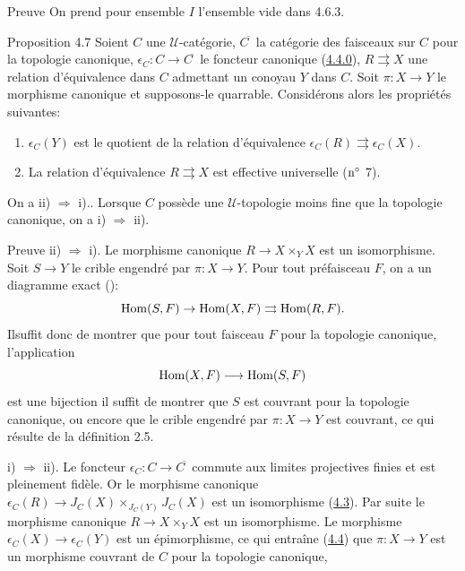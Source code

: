 \documentclass[10pt]{../fichiers-configuration-latex/smfart}
\begin{document}
\begin{enonce*}[remark]{Preuve}
On prend pour ensemble $I$ l'ensemble vide dans 4.6.3.
\end{enonce*}

\begin{enonce*}{Proposition 4.7}
Soient $C$ une $𝒰$-catégorie,
$C^{\widetilde{\phantom{,}}}$ la catégorie des faisceaux sur $C$
pour la topologie canonique, $\epsilon_C:C\rightarrow
C^{\widetilde{\phantom{,}}}$ le foncteur canonique
(\hyperref[II.subsubsec4.4.0]{4.4.0}), $R\rightrightarrows X$ une relation
d'équivalence dans $C$ admettant un conoyau $Y$ dans $C$. Soit
$\pi:X\rightarrow Y$ le morphisme canonique et supposons-le
quarrable. Considérons alors les propriétés suivantes:
\begin{enumerate}
\renewcommand{\theenumi}{\roman{enumi}}
\renewcommand{\labelenumi}{\theenumi)}
\item $\epsilon_C(Y)$ est le quotient de la relation d'équivalence
  $\epsilon_C(R)\rightrightarrows \epsilon_C(X)$.

\item La relation d'équivalence $R\rightrightarrows X$ est effective
  universelle {\rm(\cf ${\rm n^{\circ}}$ 7).}
\end{enumerate}
On a {\rm{ii) $\Rightarrow$ i).}}. Lorsque $C$ possède une
$𝒰$-topologie moins fine que la topologie canonique, on a
{\rm{i) $\Rightarrow$ ii).}}
\end{enonce*}

\begin{enonce*}[remark]{Preuve}
ii) $\Rightarrow$ i). Le morphisme canonique $R\rightarrow X\times_Y
X$ est un isomorphisme. Soit $S\rightarrow Y$ le crible engendré
par $\pi:X\rightarrow Y$. Pour tout préfaisceau $F$, on a un
diagramme exact ():
$$
\operatorname{Hom}(S,F)\rightarrow \operatorname{Hom}(X,F)\rightrightarrows \operatorname{Hom}(R,F){}.
$$
Il\pageoriginale suffit donc de montrer que pour tout faisceau $F$
pour la topologie canonique, l'application
$$
\operatorname{Hom}(X,F)\longrightarrow \operatorname{Hom}(S,F)
$$
est une bijection \ie il suffit de montrer que $S$ est couvrant pour
la topologie canonique, ou encore que le crible engendré par
$\pi:X\rightarrow Y$ est couvrant, ce qui résulte de la
définition 2.5.

\noindent i) $\Rightarrow$ ii). Le foncteur $\epsilon_C:C\rightarrow
C^{\widetilde{\phantom{,}}}$ commute aux limites projectives finies
et est pleinement fidèle. Or le morphisme canonique
$\epsilon_C(R)\rightarrow J_C(X)\times_{J_C(Y)}J_C(X)$ est un
isomorphisme (\hyperref[II.prop4.3]{4.3}). Par suite le morphisme canonique
$R\rightarrow X\times_Y X$ est un isomorphisme. Le morphisme
$\epsilon_C(X)\rightarrow \epsilon_C(Y)$ est un épimorphisme, ce
qui entraîne (\hyperref[II.theo4.4]{4.4}) que $\pi:X\rightarrow Y$ est un
morphisme couvrant de $C$ pour la topologie canonique, \cqfd
\end{enonce*}
\end{document}
